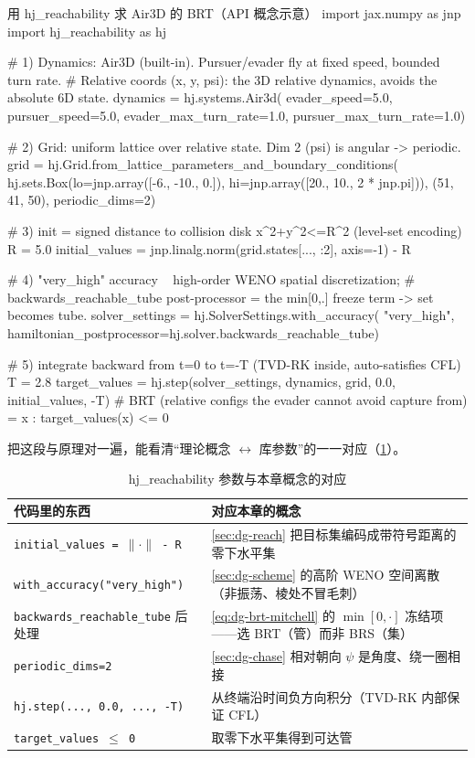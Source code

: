 \begin{codebox}[Python]{用 hj\_reachability 求 Air3D 的 BRT（API 概念示意）}
import jax.numpy as jnp
import hj_reachability as hj

# 1) Dynamics: Air3D (built-in). Pursuer/evader fly at fixed speed, bounded turn rate.
#    Relative coords (x, y, psi): the 3D relative dynamics, avoids the absolute 6D state.
dynamics = hj.systems.Air3d(
    evader_speed=5.0, pursuer_speed=5.0,
    evader_max_turn_rate=1.0, pursuer_max_turn_rate=1.0)

# 2) Grid: uniform lattice over relative state. Dim 2 (psi) is angular -> periodic.
grid = hj.Grid.from_lattice_parameters_and_boundary_conditions(
    hj.sets.Box(lo=jnp.array([-6., -10., 0.]),
                hi=jnp.array([20.,  10., 2 * jnp.pi])),
    (51, 41, 50), periodic_dims=2)

# 3) init = signed distance to collision disk {x^2+y^2<=R^2} (level-set encoding)
R = 5.0
initial_values = jnp.linalg.norm(grid.states[..., :2], axis=-1) - R

# 4) "very_high" accuracy ~ high-order WENO spatial discretization;
#    backwards_reachable_tube post-processor = the min[0,.] freeze term -> set becomes tube.
solver_settings = hj.SolverSettings.with_accuracy(
    "very_high",
    hamiltonian_postprocessor=hj.solver.backwards_reachable_tube)

# 5) integrate backward from t=0 to t=-T (TVD-RK inside, auto-satisfies CFL)
T = 2.8
target_values = hj.step(solver_settings, dynamics, grid, 0.0, initial_values, -T)
# BRT (relative configs the evader cannot avoid capture from) = {x : target_values(x) <= 0}
\end{codebox}

把这段与原理对一遍，能看清“理论概念 $\leftrightarrow$ 库参数”的一一对应（\cref{tab:dg-api}）。

\begin{table}[H]\centering\small
\caption{hj\_reachability 参数与本章概念的对应}
\label{tab:dg-api}
\begin{tabular}{p{} p{}}
\toprule
代码里的东西 & 对应本章的概念 \\
\midrule
\texttt{initial\_values = $\lVert\cdot\rVert$ - R} & \cref{sec:dg-reach} 把目标集编码成带符号距离的零下水平集 \\
\texttt{with\_accuracy("very\_high")} & \cref{sec:dg-scheme} 的高阶 WENO 空间离散（非振荡、棱处不冒毛刺） \\
\texttt{backwards\_reachable\_tube} 后处理 & \cref{eq:dg-brt-mitchell} 的 $\min[0,\cdot]$ 冻结项——选 BRT（管）而非 BRS（集） \\
\texttt{periodic\_dims=2} & \cref{sec:dg-chase} 相对朝向 $\psi$ 是角度、绕一圈相接 \\
\texttt{hj.\allowbreak step(..., 0.0, ..., -T)} & 从终端沿时间负方向积分（TVD-RK 内部保证 CFL） \\
\texttt{target\_values $\le$ 0} & 取零下水平集得到可达管 \\
\bottomrule
\end{tabular}
\end{table}

